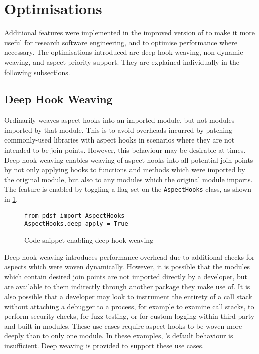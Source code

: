 \section{Optimisations}

Additional features were implemented in the improved version of \pdsf to make it
more useful for research software engineering, and to optimise performance where
necessary. The optimisations introduced are deep hook weaving, non-dynamic
weaving, and aspect priority support. They are explained individually in the
following subsections.

\subsection{Deep Hook Weaving}\label{deep_hook_weaving}

Ordinarily \pdsf weaves aspect hooks into an imported module, but not modules
imported by that module. This is to avoid overheads incurred by patching
commonly-used libraries with aspect hooks in scenarios where they are not
intended to be join-points. However, this behaviour may be desirable at times.
Deep hook weaving enables weaving of aspect hooks into all potential join-points
by not only applying hooks to functions and methods which were imported by the
original module, but also to any modules which the original module imports. The
feature is enabled by toggling a flag set on the \lstinline{AspectHooks} class,
as shown in \cref{fig:enabling_deep_apply}.

\begin{figure}
    \begin{lstlisting}
from pdsf import AspectHooks
AspectHooks.deep_apply = True
    \end{lstlisting}
    \caption{Code snippet enabling deep hook weaving}
    \label{fig:enabling_deep_apply}
\end{figure}

Deep hook weaving introduces performance overhead due to additional checks for
aspects which were woven dynamically. However, it is possible that the modules
which contain desired join points are not imported directly by a developer, but
are available to them indirectly through another package they make use of. It is
also possible that a developer may look to instrument the entirety of a call
stack without attaching a debugger to a process, for example to examine call
stacks, to perform security checks, for fuzz testing, or for custom logging
within third-party and built-in modules. These use-cases require aspect hooks to
be woven more deeply than to only one module. In these examples, \pdsf{}'s
default behaviour is insufficient. Deep weaving is provided to support these use
cases.


